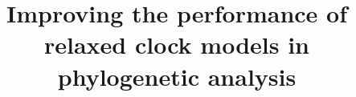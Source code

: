 \documentclass{bmcart}
\begin{document}
\begin{frontmatter}
\begin{fmbox}

\title{Improving the performance of relaxed clock models in phylogenetic analysis}

\author[
]{\inits{} }
\author[
   addressref={aff1},
   corref={aff1},                       %
   email={alexei@cs.auckland.ac.nz}   %
]{\inits{} }

\address[id=aff1]{%
  , %
  ,                     %
  ,                              %
}



\end{fmbox}%


\end{frontmatter}
\end{document}
